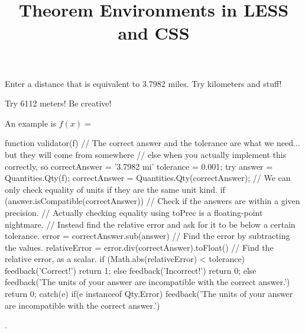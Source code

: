 \documentclass{ximera}
\begin{document}
\title{Theorem Environments in LESS and CSS}

\begin{exercise}
Enter a distance that is equivalent to 3.7982 miles. Try kilometers and stuff!

\begin{solution}
\begin{hint}
Try 6112 meters! Be creative!
\end{hint}
An example is $f(x) = $ \begin{expression-answer}
	function validator(f) {			
		// The correct answer and the tolerance are what we need... but they will come from somewhere
		// else when you actually implement this correctly, so 
		correctAnswer = '3.7982 mi'
		tolerance = 0.001;
		try {
			answer = Quantities.Qty(f);
			correctAnswer = Quantities.Qty(correctAnswer);   
			// We can only check equality of units if they are the same unit kind.
			if (answer.isCompatible(correctAnswer))
			{
				// Check if the answers are within a given precision. 
				// Actually checking equality using toPrec is a floating-point nightmare.
				// Instead find the relative error and ask for it to be below a certain tolerance.
			    error = correctAnswer.sub(answer)		  			// Find the error by subtracting the values.
			    relativeError = error.div(correctAnswer).toFloat()  // Find the relative error, as a scalar.
				if (Math.abs(relativeError) < tolerance) {
					feedback('Correct!')
					return 1;
				} else {
					feedback('Incorrect!')
					return 0;
				}
			} else {
				feedback('The units of your answer are incompatible with the correct answer.')
				return 0;
			}
		}
		catch(e) {
		  if(e instanceof Qty.Error) {
		    feedback('The units of your answer are incompatible with the correct answer.')
		  }
		}
	}
\end{expression-answer}.
\end{solution}

\end{exercise}
\end{document}
